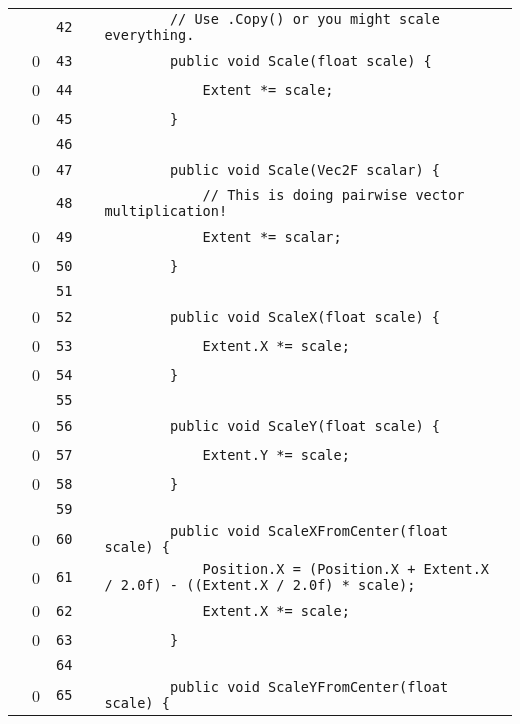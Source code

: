 \documentclass[a4paper,landscape,10pt]{article}
\begin{document}
\begin{longtable}[l]{lrrll}
\cellcolor{gray} &  & \verb~42~ & & \verb~        // Use .Copy() or you might scale everything.~\\
\cellcolor{red} & 0 & \verb~43~ & & \verb~        public void Scale(float scale) {~\\
\cellcolor{red} & 0 & \verb~44~ & & \verb~            Extent *= scale;~\\
\cellcolor{red} & 0 & \verb~45~ & & \verb~        }~\\
\cellcolor{gray} &  & \verb~46~ & & \verb~~\\
\cellcolor{red} & 0 & \verb~47~ & & \verb~        public void Scale(Vec2F scalar) {~\\
\cellcolor{gray} &  & \verb~48~ & & \verb~            // This is doing pairwise vector multiplication!~\\
\cellcolor{red} & 0 & \verb~49~ & & \verb~            Extent *= scalar;~\\
\cellcolor{red} & 0 & \verb~50~ & & \verb~        }~\\
\cellcolor{gray} &  & \verb~51~ & & \verb~~\\
\cellcolor{red} & 0 & \verb~52~ & & \verb~        public void ScaleX(float scale) {~\\
\cellcolor{red} & 0 & \verb~53~ & & \verb~            Extent.X *= scale;~\\
\cellcolor{red} & 0 & \verb~54~ & & \verb~        }~\\
\cellcolor{gray} &  & \verb~55~ & & \verb~~\\
\cellcolor{red} & 0 & \verb~56~ & & \verb~        public void ScaleY(float scale) {~\\
\cellcolor{red} & 0 & \verb~57~ & & \verb~            Extent.Y *= scale;~\\
\cellcolor{red} & 0 & \verb~58~ & & \verb~        }~\\
\cellcolor{gray} &  & \verb~59~ & & \verb~~\\
\cellcolor{red} & 0 & \verb~60~ & & \verb~        public void ScaleXFromCenter(float scale) {~\\
\cellcolor{red} & 0 & \verb~61~ & & \verb~            Position.X = (Position.X + Extent.X / 2.0f) - ((Extent.X / 2.0f) * scale);~\\
\cellcolor{red} & 0 & \verb~62~ & & \verb~            Extent.X *= scale;~\\
\cellcolor{red} & 0 & \verb~63~ & & \verb~        }~\\
\cellcolor{gray} &  & \verb~64~ & & \verb~~\\
\cellcolor{red} & 0 & \verb~65~ & & \verb~        public void ScaleYFromCenter(float scale) {~\\

\end{longtable}
\end{document}
